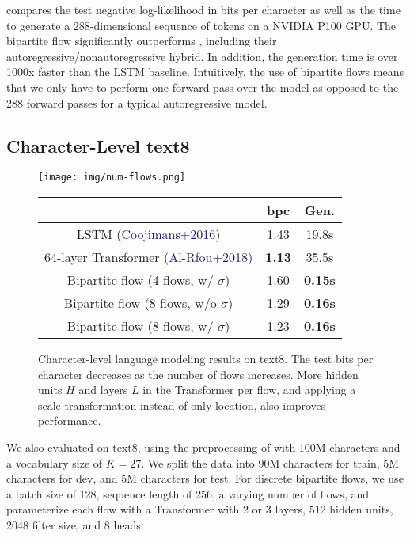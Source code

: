 \documentclass{article}
\newcommand{\blue}[1]{\textcolor{MidnightBlue}{#1}}
\begin{document}
 compares the test negative log-likelihood in bits per character as well as the time to generate a 288-dimensional sequence of tokens on a NVIDIA P100 GPU. The bipartite flow significantly outperforms \citet{ziegler2019latent}, including their autoregressive/nonautoregressive hybrid. In addition, the generation time is over 1000x faster than the LSTM baseline. Intuitively, the use of bipartite flows means that we only have to perform one forward pass over the model as opposed to the 288 forward passes for a typical autoregressive model.

\subsection{Character-Level text8}
\begin{figure}[t!]
\centering
\begin{minipage}{0.45\textwidth}
\centering
\texttt{[image: img/num-flows.png]}
\end{minipage}\hfill \begin{minipage}{0.54\textwidth}
\centering
\begin{tabular}{ccc}
\\  \toprule
& bpc & Gen. \\ \midrule
LSTM
(\blue{Coojimans+2016})
& 1.43 &  19.8s \\
64-layer Transformer
(\blue{Al-Rfou+2018})
&  \textbf{1.13} & 35.5s \\
Bipartite flow (4 flows, w/ $\sigma$) & 1.60 & \textbf{0.15s} \\
Bipartite flow (8 flows, w/o $\sigma$) & 1.29 & \textbf{0.16s} \\
Bipartite flow (8 flows, w/ $\sigma$) & 1.23 & \textbf{0.16s} \\
\bottomrule
\end{tabular}
\end{minipage}
\caption{Character-level language modeling results on text8. The test bits per character decreases as the number of flows increases. More hidden units $H$ and layers $L$ in the Transformer per flow, and applying a scale transformation instead of only location, also improves performance.
}
\label{fig:text8}
\end{figure}

We also evaluated on text8, using the preprocessing of \citet{mikolov2012subword,zhang2016architectural} with 100M characters and a vocabulary size of $K=27$. We split the data into 90M characters for train, 5M characters for dev, and 5M characters for test. For discrete bipartite flows, we use a batch size of 128, sequence length of 256, a varying number of flows, and parameterize each flow with a Transformer with 2 or 3 layers, 512 hidden units, 2048 filter size, and 8 heads.
\end{document}
